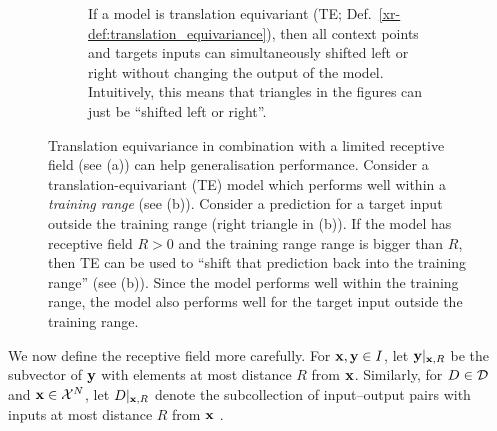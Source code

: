 \documentclass[12pt]{report}
\newcommand{\xrprefix}[1]{xr-#1}
\begin{document}
\begin{figure}[t]
\begin{subfigure}[t]{0.49\linewidth}
        \caption{
            If a model is translation equivariant (TE; Def.\ \ref{\xrprefix{def:translation_equivariance}}),
            then all context points and targets inputs can simultaneously shifted left or right
            without changing the output of the model.
            Intuitively, this means that triangles in the figures can just be ``shifted left or right''. %
        }
    \end{subfigure}
    \caption[
       Translation equivariance can help generalisation
    ]{
        Translation equivariance in combination with a limited receptive field (see (a)) can help generalisation performance.
        Consider a translation-equivariant (TE) model which performs well within a \emph{training range} (see (b)).
        Consider a prediction for a target input outside the training range (right triangle in (b)).
        If the model has receptive field $R > 0$ and the training range range is bigger than $R$, then TE can be used to ``shift that prediction back into the training range'' (see (b)).
        Since the model performs well within the training range, the model also performs well for the target input outside the training range.
    }
    \label{fig:generalisation}
\end{figure}

We now define the receptive field more carefully.
For $\mathbf{x}, \mathbf{y} \in I$, let $\mathbf{y}|_{\mathbf{x},R}$ be the subvector of $\mathbf{y}$ with elements at most distance $R$ from $\mathbf{x}$.
Similarly, for $D \in \mathcal{D}$ and $\mathbf{x} \in \mathcal{X}^N$, let $D|_{\mathbf{x},R}$ denote the subcollection of input--output pairs with inputs at most distance $R$ from $\mathbf{x}$ .
\end{document}
